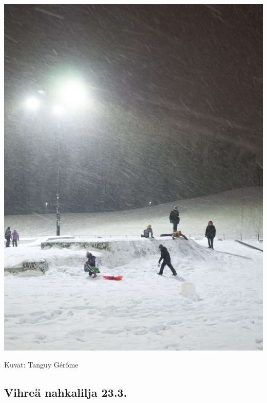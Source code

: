 \documentclass[10pt,finnish,a5paper,headings=small,twoside=semi]{scrartcl}
\begin{document}
\begin{multicols}{2}
	\vspace*{0.16cm}
	\noindent\includegraphics[width=\linewidth]{assets/laskiaistiistai3}

\end{multicols}

\medskip
\noindent\null\hfill Kuvat: Tanguy Gérôme

\clearpage
\subsection{Vihreä nahkalilja 23.3.}
\end{document}
